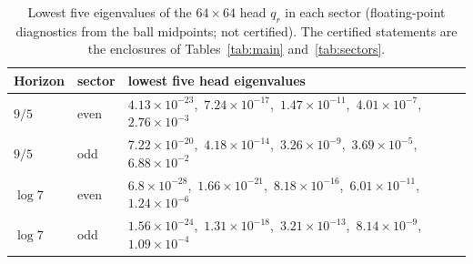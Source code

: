 \begin{table}[ht]
\centering
\caption{Lowest five eigenvalues of the $64\times64$ head $q_r$ in each sector (floating-point diagnostics from the ball midpoints; not certified). The certified statements are the enclosures of Tables~\ref{tab:main} and~\ref{tab:sectors}.}
\label{tab:spectra}
\small
\begin{tabular}{@{}lll@{}}
\toprule
Horizon & sector & lowest five head eigenvalues\\
\midrule
$9/5$ & even & $4.13\times10^{-23}$,\ $7.24\times10^{-17}$,\ $1.47\times10^{-11}$,\ $4.01\times10^{-7}$,\ $2.76\times10^{-3}$\\
$9/5$ & odd & $7.22\times10^{-20}$,\ $4.18\times10^{-14}$,\ $3.26\times10^{-9}$,\ $3.69\times10^{-5}$,\ $6.88\times10^{-2}$\\
$\log7$ & even & $6.8\times10^{-28}$,\ $1.66\times10^{-21}$,\ $8.18\times10^{-16}$,\ $6.01\times10^{-11}$,\ $1.24\times10^{-6}$\\
$\log7$ & odd & $1.56\times10^{-24}$,\ $1.31\times10^{-18}$,\ $3.21\times10^{-13}$,\ $8.14\times10^{-9}$,\ $1.09\times10^{-4}$\\
\bottomrule
\end{tabular}
\end{table}
